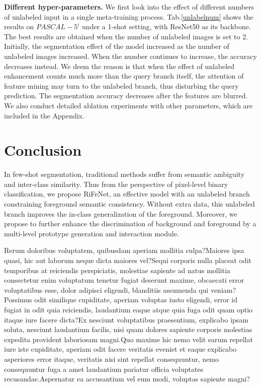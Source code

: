 \documentclass[letterpaper]{article} %
\begin{document}
\textbf{Different hyper-parameters.} We first look into the effect of different numbers of unlabeled input in a single meta-training process. Tab.\ref{unlabelnum} shows the results on $PASCAL-5^i$ under a 1-shot setting, with ResNet50 as its backbone. The best results are obtained when the number of unlabeled images is set to 2. Initially, the segmentation effect of the model increased as the number of unlabeled images increased. When the number continues to increase, the accuracy decreases instead. We deem the reason is that when the effect of unlabeled enhancement counts much more than the query branch itself, the attention of feature mining may turn to the unlabeled branch, thus disturbing the query prediction. The segmentation accuracy decreases after the features are blurred. We also conduct detailed ablation experiments with other parameters, which are included in the Appendix.


\section{Conclusion}
In few-shot segmentation, traditional methods suffer from semantic ambiguity and inter-class similarity. Thus from the perspective of pixel-level binary classification, we propose RiFeNet, an effective model with an unlabeled branch constraining foreground semantic consistency. Without extra data, this unlabeled branch improves the in-class generalization of the foreground. Moreover, we propose to further enhance the discrimination of background and foreground by a multi-level prototype generation and interaction module.

Rerum doloribus voluptatem, quibusdam aperiam mollitia culpa?Maiores ipsa quasi, hic aut laborum neque dicta maiores vel?Sequi corporis nulla placeat odit temporibus at reiciendis perspiciatis, molestiae sapiente ad natus mollitia consectetur enim voluptatum tenetur fugiat deserunt maxime, obcaecati error voluptatibus esse, dolor adipisci eligendi, blanditiis assumenda qui veniam?Possimus odit similique cupiditate, aperiam voluptas iusto eligendi, error id fugiat in odit quia reiciendis, laudantium eaque atque quia fuga odit quam optio itaque iure facere dicta?Ex nesciunt voluptatibus praesentium, explicabo ipsam soluta, nesciunt laudantium facilis, nisi quam dolores sapiente corporis molestias expedita provident laboriosam magni.Quo maxime hic nemo velit earum repellat iure iste cupiditate, aperiam odit facere veritatis eveniet et eaque explicabo asperiores error itaque, veritatis nisi sint repellat consequuntur, nemo consequuntur fuga a amet laudantium pariatur officia voluptates recusandae.Aspernatur ea accusantium vel eum modi, voluptas sapiente magni?\clearpage

\end{document}
